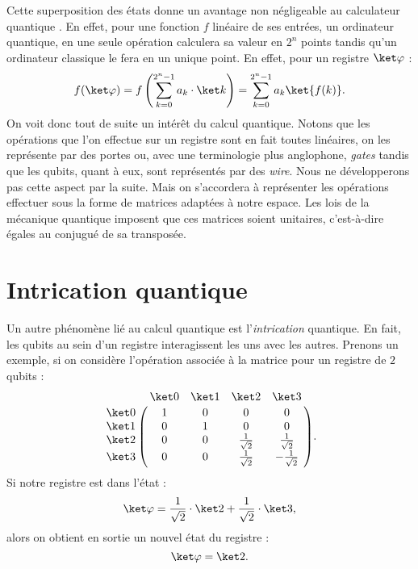 \documentclass[a4paper,11pt]{tipe}
\begin{document}
Cette superposition des états donne un avantage non négligeable au calculateur
quantique . En effet, pour une fonction $f$ linéaire de ses entrées, un
ordinateur quantique, en une seule opération calculera sa valeur en $2^n$ points
tandis qu'un ordinateur classique le fera en un unique point. En effet, pour un
registre $\ket \varphi$ :
\[f(\ket \varphi) = f\left(\sum_{k=0}^{2^n - 1} a_k\cdot\ket k\right) =
\sum_{k=0}^{2^n-1} a_k \ket{f(k)}.\]
On voit donc tout de suite un intérêt du calcul quantique. Notons que les
opérations que l'on effectue sur un registre sont en fait toutes linéaires, on
les représente par des portes ou, avec une terminologie plus anglophone,
\emph{gates} tandis que les qubits, quant à eux, sont représentés par des
\emph{wire}. Nous ne développerons pas cette aspect par la suite. Mais on
s'accordera à représenter les opérations effectuer sous la forme de matrices
adaptées à notre espace. Les lois de la mécanique quantique imposent que ces
matrices soient unitaires, c'est-à-dire égales au conjugué de sa transposée.
\section{Intrication quantique}
Un autre phénomène lié au calcul quantique est l'\emph{intrication} quantique.
En fait, les qubits au sein d'un registre interagissent les uns avec les
autres. Prenons un exemple, si on considère l'opération associée à la matrice
pour un registre de $2$ qubits :
\[\bordermatrix{
  ~ & \ket 0 & \ket 1 & \ket 2 & \ket 3 \cr
  \ket 0 & 1 & 0 & 0 & 0 \cr
  \ket 1 & 0 & 1 & 0 & 0 \cr
  \ket 2 & 0 & 0 & \frac 1 {\sqrt 2} & \frac 1 {\sqrt 2} \cr
  \ket 3 & 0 & 0 & \frac 1 {\sqrt 2} & - \frac 1 {\sqrt 2} \cr
}.\]
Si notre registre est dans l'état :
\[ \ket\varphi = \frac 1 {\sqrt 2} \cdot \ket 2 + \frac 1 {\sqrt 2} \cdot
\ket 3, \]
alors on obtient en sortie un nouvel état du registre :
\[ \ket\varphi = \ket 2.\]
\end{document}
